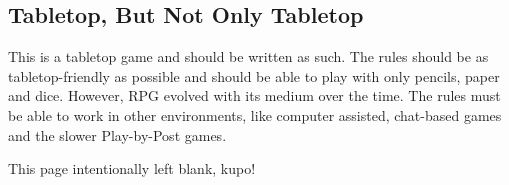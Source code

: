 \begin{multicols}{2}
\subsection{Tabletop, But Not Only Tabletop}\label{subsec:tabletop}
This is a tabletop game and should be written as such. The rules should be as tabletop-friendly as possible and should be able to play with only pencils, paper and dice. However, RPG evolved with its medium over the time. The rules must be able to work in other environments, like computer assisted, chat-based games and the slower Play-by-Post games.

\end{multicols}
\vfill
\begin{center}
\end{center}

\clearpage
\begin{center}



    \textcolor{mogred}{\arabtype\LARGE This page intentionally left blank, kupo!}

\end{center}